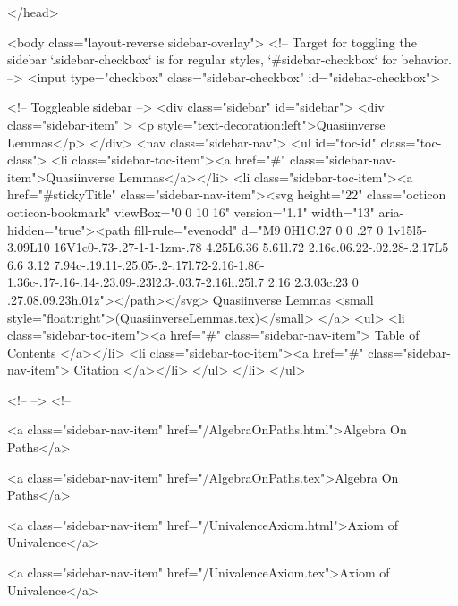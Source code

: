 </head>


  <body class="layout-reverse sidebar-overlay">
    <!-- Target for toggling the sidebar `.sidebar-checkbox` is for regular
     styles, `#sidebar-checkbox` for behavior. -->
<input type="checkbox" class="sidebar-checkbox" id="sidebar-checkbox">

<!-- Toggleable sidebar -->
<div class="sidebar" id="sidebar">
  <div class="sidebar-item" >
    <p style="text-decoration:left">Quasiinverse Lemmas</p>
  </div>
  <nav class="sidebar-nav">
    <ul id="toc-id" class="toc-class">
  <li class="sidebar-toc-item"><a href="#" class="sidebar-nav-item">Quasiinverse Lemmas</a></li>
  <li class="sidebar-toc-item"><a href="#stickyTitle" class="sidebar-nav-item"><svg height="22" class="octicon octicon-bookmark" viewBox="0 0 10 16" version="1.1" width="13" aria-hidden="true"><path fill-rule="evenodd" d="M9 0H1C.27 0 0 .27 0 1v15l5-3.09L10 16V1c0-.73-.27-1-1-1zm-.78 4.25L6.36 5.61l.72 2.16c.06.22-.02.28-.2.17L5 6.6 3.12 7.94c-.19.11-.25.05-.2-.17l.72-2.16-1.86-1.36c-.17-.16-.14-.23.09-.23l2.3-.03.7-2.16h.25l.7 2.16 2.3.03c.23 0 .27.08.09.23h.01z"></path></svg> Quasiinverse Lemmas <small style="float:right">(QuasiinverseLemmas.tex)</small>
</a>
    <ul>
      <li class="sidebar-toc-item"><a href="#" class="sidebar-nav-item"> Table of Contents </a></li>
      <li class="sidebar-toc-item"><a href="#" class="sidebar-nav-item"> Citation </a></li>
    </ul>
  </li>
</ul>


    <!--  -->
    <!-- 
      
    
      
    
      
    
      
        
      
    
      
        
          <a class="sidebar-nav-item" href="/AlgebraOnPaths.html">Algebra On Paths</a>
        
      
    
      
        
          <a class="sidebar-nav-item" href="/AlgebraOnPaths.tex">Algebra On Paths</a>
        
      
    
      
        
          <a class="sidebar-nav-item" href="/UnivalenceAxiom.html">Axiom of Univalence</a>
        
      
    
      
        
          <a class="sidebar-nav-item" href="/UnivalenceAxiom.tex">Axiom of Univalence</a>
        
